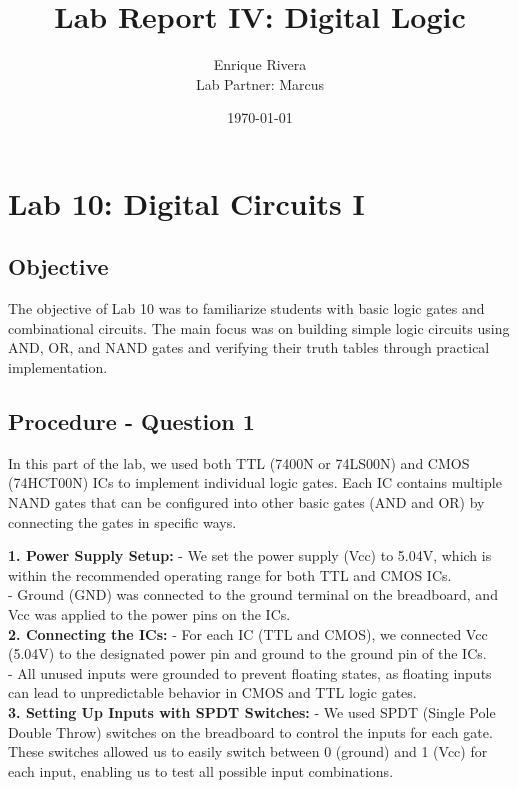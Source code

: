 \documentclass{article}
\title{Lab Report IV: Digital Logic}
\author{Enrique Rivera \\ Lab Partner: Marcus}
\date{\today}
\begin{document}
\maketitle

\section*{Lab 10: Digital Circuits I}

    \subsection*{Objective}
    The objective of Lab 10 was to familiarize students with basic logic gates and combinational circuits. The main focus was on building simple logic circuits using AND, OR, and NAND gates and verifying their truth tables through practical implementation.

    \subsection*{\textbf{Procedure - Question 1}}
    In this part of the lab, we used both TTL (7400N or 74LS00N) and CMOS (74HCT00N) ICs to implement individual logic gates. Each IC contains multiple NAND gates that can be configured into other basic gates (AND and OR) by connecting the gates in specific ways.

    \textbf{1. Power Supply Setup:}
    - We set the power supply (Vcc) to 5.04V, which is within the recommended operating range for both TTL and CMOS ICs.
    \\
    - Ground (GND) was connected to the ground terminal on the breadboard, and Vcc was applied to the power pins on the ICs.
    \\

    \textbf{2. Connecting the ICs:}
    - For each IC (TTL and CMOS), we connected Vcc (5.04V) to the designated power pin and ground to the ground pin of the ICs.
    \\
    - All unused inputs were grounded to prevent floating states, as floating inputs can lead to unpredictable behavior in CMOS and TTL logic gates.
    \\

    \textbf{3. Setting Up Inputs with SPDT Switches:}
    - We used SPDT (Single Pole Double Throw) switches on the breadboard to control the inputs for each gate. These switches allowed us to easily switch between 0 (ground) and 1 (Vcc) for each input, enabling us to test all possible input combinations.
    \\
\end{document}
